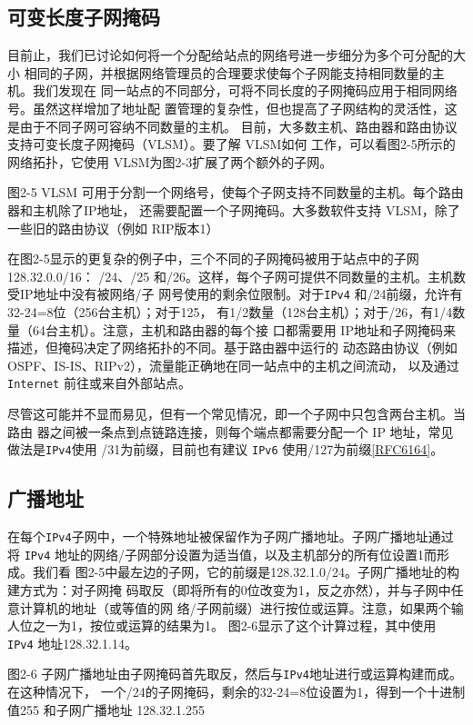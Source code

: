 \subsection{可变长度子网掩码}
目前止，我们已讨论如何将一个分配给站点的网络号进一步细分为多个可分配的大小
相同的子网，并根据网络管理员的合理要求使每个子网能支持相同数量的主机。我们发现在
同一站点的不同部分，可将不同长度的子网掩码应用于相同网络号。虽然这样增加了地址配
置管理的复杂性，但也提高了子网结构的灵活性，这是由于不同子网可容纳不同数量的主机。
目前，大多数主机、路由器和路由协议支持可变长度子网掩码（VLSM）。要了解 VLSM如何
工作，可以看图2-5所示的网络拓扑，它使用 VLSM为图2-3扩展了两个额外的子网。

图2-5 VLSM 可用于分割一个网络号，使每个子网支持不同数量的主机。每个路由器和主机除了IP地址，
还需要配置一个子网掩码。大多数软件支持 VLSM，除了一些旧的路由协议（例如 RIP版本1）

在图2-5显示的更复杂的例子中，三个不同的子网掩码被用于站点中的子网128.32.0.0/16：
/24、/25 和/26。这样，每个子网可提供不同数量的主机。主机数受IP地址中没有被网络/子
网号使用的剩余位限制。对于\verb|IPv4| 和/24前缀，允许有32-24=8位（256台主机）；对于125，
有1/2数量（128台主机）；对于/26，有1/4数量（64台主机）。注意，主机和路由器的每个接
口都需要用 IP地址和子网掩码来描述，但掩码决定了网络拓扑的不同。基于路由器中运行的
动态路由协议（例如 OSPF、IS-IS、RIPv2），流量能正确地在同一站点中的主机之间流动，
以及通过 \verb|Internet| 前往或来自外部站点。

尽管这可能并不显而易见，但有一个常见情况，即一个子网中只包含两台主机。当路由
器之间被一条点到点链路连接，则每个端点都需要分配一个 IP 地址，常见做法是\verb|IPv4|使用
/31为前缀，目前也有建议 \verb|IPv6| 使用/127为前缀\href{https://www.rfc-editor.org/rfc/rfc6164}{[RFC6164]}。

\subsection{广播地址}
在每个\verb|IPv4|子网中，一个特殊地址被保留作为子网广播地址。子网广播地址通过将
\verb|IPv4| 地址的网络/子网部分设置为适当值，以及主机部分的所有位设置1而形成。我们看
图2-5中最左边的子网，它的前缀是128.32.1.0/24。子网广播地址的构建方式为：对子网掩
码取反（即将所有的0位改变为1，反之亦然），并与子网中任意计算机的地址（或等值的网
络/子网前缀）进行按位或运算。注意，如果两个输人位之一为1，按位或运算的结果为1。
图2-6显示了这个计算过程，其中使用 \verb|IPv4| 地址128.32.1.14。

图2-6 子网广播地址由子网掩码首先取反，然后与\verb|IPv4|地址进行或运算构建而成。在这种情况下，
一个/24的子网掩码，剩余的32-24=8位设置为1，得到一个十进制值255 和子网广播地址
128.32.1.255

